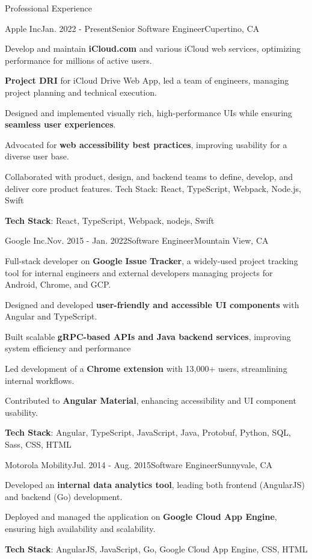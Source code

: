 \documentclass{resume} %
\begin{document}
\begin{rSection}{Professional Experience}

\begin{rSubsection}{Apple Inc}{Jan. 2022 - Present}{Senior Software Engineer}{Cupertino, CA}
\item Develop and maintain \textbf{iCloud.com} and various iCloud web services, optimizing performance for millions of active users.
\item \textbf{Project DRI} for iCloud Drive Web App, led a team of engineers, managing project planning and technical execution.
\item Designed and implemented visually rich, high-performance UIs while ensuring \textbf{seamless user experiences}.
\item Advocated for \textbf{web accessibility best practices}, improving usability for a diverse user base.
\item Collaborated with product, design, and backend teams to define, develop, and deliver core product features.
Tech Stack: React, TypeScript, Webpack, Node.js, Swift
\item \textbf{Tech Stack}: React, TypeScript, Webpack, nodejs, Swift
\end{rSubsection}


\begin{rSubsection}{Google Inc.}{Nov. 2015 - Jan. 2022}{Software Engineer}{Mountain View, CA}
\item Full-stack developer on \textbf{Google Issue Tracker}, a widely-used project tracking tool for internal engineers and external developers managing projects for Android, Chrome, and GCP.
\item Designed and developed \textbf{user-friendly and accessible UI components} with Angular and TypeScript.
\item Built scalable \textbf{gRPC-based APIs and Java backend services}, improving system efficiency and performance
\item Led development of a \textbf{Chrome extension} with 13,000+ users, streamlining internal workflows.
\item Contributed to \textbf{Angular Material}, enhancing accessibility and UI component usability.
\item \textbf{Tech Stack}: Angular, TypeScript, JavaScript, Java, Protobuf, Python, SQL, Sass, CSS, HTML

\end{rSubsection}

\begin{rSubsection}{Motorola Mobility}{Jul. 2014 - Aug. 2015}{Software Engineer}{Sunnyvale, CA}
\item Developed an \textbf{internal data analytics tool}, leading both frontend (AngularJS) and backend (Go) development.
\item Deployed and managed the application on \textbf{Google Cloud App Engine}, ensuring high availability and scalability.
\item \textbf{Tech Stack}: AngularJS, JavaScript, Go, Google Cloud App Engine, CSS, HTML
\end{rSubsection}


\end{rSection}
\end{document}
